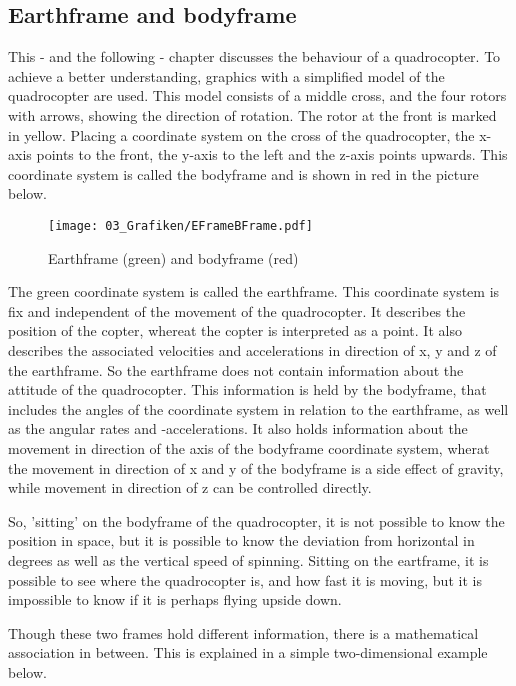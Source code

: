 \subsection{Earthframe and bodyframe}\label{chapter_EQUATIONS_OF_MOTION}

This - and the following - chapter discusses the behaviour of a quadrocopter. To achieve a better understanding, graphics with a simplified model of the quadrocopter are used. This model consists of a middle cross, and the four rotors with arrows, showing the direction of rotation. The rotor at the front is marked in yellow.
Placing a coordinate system on the cross of the quadrocopter, the x-axis points to the front, the y-axis to the left and the z-axis points upwards. This coordinate system is called the bodyframe and is shown in red in the picture below.

\begin{figure}[htbp]
	\centering
		\texttt{[image: 03\_Grafiken/EFrameBFrame.pdf]}
	\caption{Earthframe (green) and bodyframe (red)}
	\label{fig:EFrameBFrame}
\end{figure}

The green coordinate system is called the earthframe. This coordinate system is fix and independent of the movement of the quadrocopter. It describes the position of the copter, whereat the copter is interpreted as a point. It also describes the associated velocities and accelerations in direction of x, y and z of the earthframe.
So the earthframe does not contain information about the attitude of the quadrocopter. This information is held by the bodyframe, that includes the angles of the coordinate system in relation to the earthframe, as well as the angular rates and -accelerations. It also holds information about the movement in direction of the axis of the bodyframe coordinate system, wherat the movement in direction of x and y of the bodyframe is a side effect of gravity, while movement in direction of z can be controlled directly.

So, 'sitting' on the bodyframe of the quadrocopter, it is not possible to know the position in space, but it is possible to know the deviation from horizontal in degrees as well as the vertical speed of spinning. Sitting on the eartframe, it is possible to see where the quadrocopter is, and how fast it is moving, but it is impossible to know if it is perhaps flying upside down.

Though these two frames hold different information, there is a mathematical association in between. This is explained in a simple two-dimensional example below.

